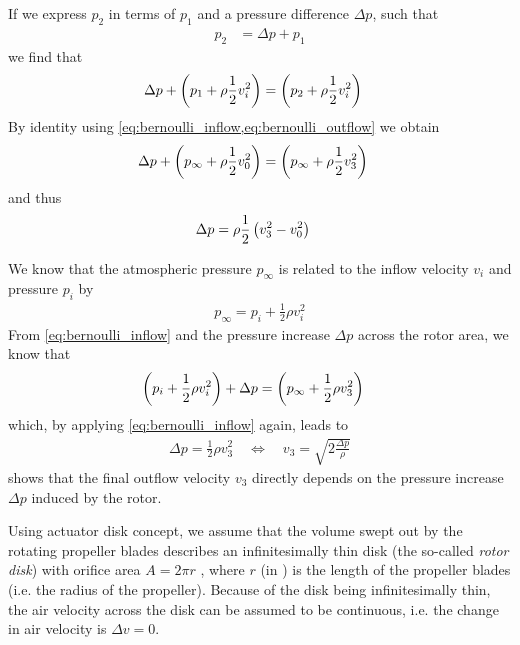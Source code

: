 If we express $p_2$ in terms of $p_1$ and a pressure difference $\Delta p$, such that
\begin{align}
p_2 &= \Delta p + p_1
\end{align}
%
we find that
%
\begin{align}
\Delta p + \left( p_1 + \rho \frac{1}{2} v^2_i \right) &= \left(  p_2 + \rho \frac{1}{2} v^2_i \right)
\end{align}
%
By identity using \cref{eq:bernoulli_inflow,eq:bernoulli_outflow} we obtain
%
\begin{align}
\Delta p + \left( p_\infty + \rho \frac{1}{2} v^2_0 \right) &= \left( p_\infty + \rho \frac{1}{2} v^2_3 \right) \label{eq:bernoulli_induced_deltap}
\end{align}
%
and thus
%
\begin{align}
\Delta p &= \rho \frac{1}{2} \left( v^2_3 - v^2_0 \right)
\end{align}


We know that the atmospheric pressure $p_\infty$ is related to the inflow velocity $v_i$ and pressure $p_i$ by
%
\begin{align}
p_\infty = p_i + \frac{1}{2}\rho v_i^2 \label{eq:bernoulli_inflow_x}
\end{align}
%
From \cref{eq:bernoulli_inflow} and the pressure increase $\Delta p$ across the
rotor area, we know that 
%
\begin{align}
 \left(p_i + \frac{1}{2}\rho v_i^2 \right) + \Delta p &= \left( p_\infty + \frac{1}{2}\rho v_3^2 \right) \label{eq:bernoulli_outflow_x}
\end{align}
%
which, by applying \cref{eq:bernoulli_inflow} again, leads to
%
\begin{align}
 \Delta p = \frac{1}{2}\rho v_3^2 
 \quad \Leftrightarrow \quad 
 v_3 = \sqrt{2\frac{\Delta p}{\rho}} \label{eq:deltap_vinfty} 
\end{align}
%
 shows that the final outflow velocity $v_3$ directly depends on the pressure increase $\Delta p$ induced by the rotor.


Using actuator disk concept, we assume that the volume swept out by the rotating propeller blades describes an infinitesimally thin disk (the so-called \textit{rotor disk}) with orifice area $A = 2\pi r$%
, where $r$ (in \withunit{\metre}) is the length of the propeller blades (i.e. the radius of the propeller).
Because of the disk being infinitesimally thin, the air velocity across the disk can be assumed to be continuous, i.e. the change in air velocity is $\Delta v = 0$. 

